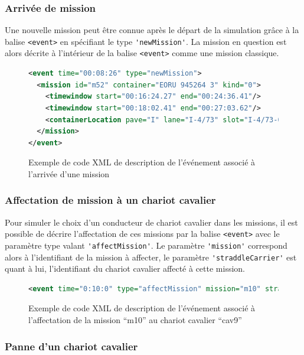 \subsubsection{Arrivée de mission}

Une nouvelle mission peut être connue après le départ de la simulation grâce à la balise \verb!<event>! en spécifiant le type \verb!'newMission'!. La mission en question est alors décrite à l'intérieur de la balise \verb!<event>! comme une mission classique.

\begin{figure}[ht]
\centering
 \begin{lstlisting}[language=XML]
<event time="00:08:26" type="newMission">
  <mission id="m52" container="EORU 945264 3" kind="0">
    <timewindow start="00:16:24.27" end="00:24:36.41"/>
    <timewindow start="00:18:02.41" end="00:27:03.62"/>
    <containerLocation pave="I" lane="I-4/73" slot="I-4/73-0" level="1" align="center"/>
  </mission>
</event>
\end{lstlisting}
\caption{Exemple de code XML de description de l'événement associé à l'arrivée d'une mission}
\label{fig:simulation:evt:newMission}
\end{figure}

\subsubsection{Affectation de mission à un chariot cavalier}

Pour simuler le choix d'un conducteur de chariot cavalier dans les missions, il est possible de décrire l'affectation de ces missions par la balise \verb!<event>! avec le paramètre type valant \verb!'affectMission'!. Le paramètre \verb!'mission'! correspond alors à l'identifiant de la mission à affecter, le paramètre \verb!'straddleCarrier'! est quant à lui, l'identifiant du chariot cavalier affecté à cette mission. 

\begin{figure}[ht]
\centering
 \begin{lstlisting}[language=XML]
<event time="0:10:0" type="affectMission" mission="m10" straddleCarrier="cav9"/>
\end{lstlisting}
\caption{Exemple de code XML de description de l'événement associé à l'affectation de la mission ``m10'' au chariot cavalier ``cav9''}
\label{fig:simulation:evt:affectMission}
\end{figure}

\subsubsection{Panne d'un chariot cavalier}

